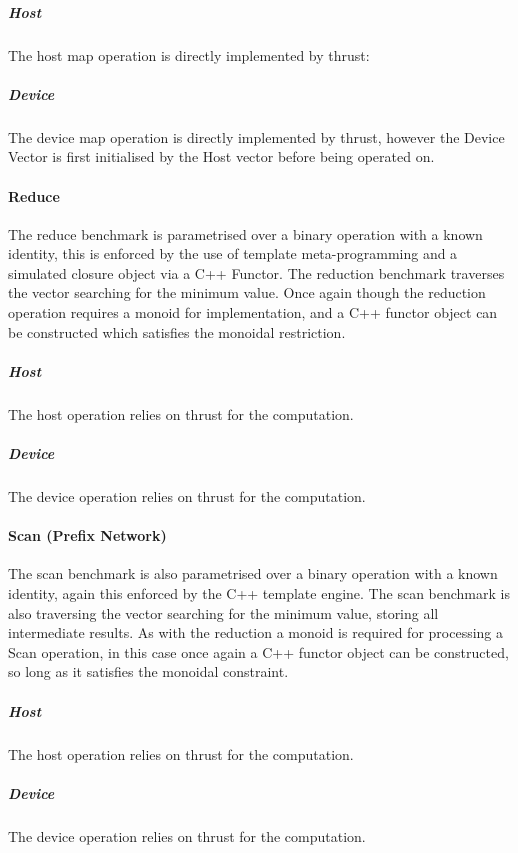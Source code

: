 \subparagraph{Host}
The host map operation is directly implemented by thrust:


\subparagraph{Device}
The device map operation is directly implemented by thrust, however the Device Vector is first
initialised by the Host vector before being operated on.



\paragraph{Reduce}
The reduce benchmark is parametrised over a binary operation with a known identity, this is enforced
by the use of template meta-programming and a simulated closure object via a C++ Functor. The
reduction benchmark traverses the vector searching for the minimum value. Once again though the
reduction operation requires a monoid for implementation, and a C++ functor object can be
constructed which satisfies the monoidal restriction.

\subparagraph{Host}
The host operation relies on thrust for the computation.


\subparagraph{Device}
The device operation relies on thrust for the computation.



\paragraph{Scan (Prefix Network)}
The scan benchmark is also parametrised over a binary operation with a known identity, again this
enforced by the C++ template engine. The scan benchmark is also traversing the vector searching for
the minimum value, storing all intermediate results. As with the reduction a monoid is required for
processing a Scan operation, in this case once again a C++ functor object can be constructed, so
long as it satisfies the monoidal constraint.

\subparagraph{Host}
The host operation relies on thrust for the computation.


\subparagraph{Device}
The device operation relies on thrust for the computation.


